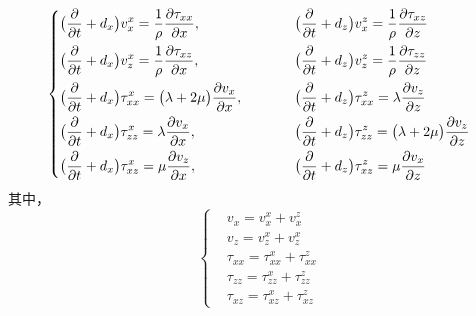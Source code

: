 \documentclass[UTF8]{ctexart}
\begin{document}
\begin{equation}
\left\{ \begin{aligned}
& \big(\frac{\partial}{\partial t}+d_x\big)v_x^x=\frac{1}{\rho}\frac{\partial \tau_{xx}}{\partial x}, & \hspace{10mm} & \big(\frac{\partial}{\partial t}+d_z\big)v_x^z=\frac{1}{\rho}\frac{\partial \tau_{xz}}{\partial z} \\
& \big(\frac{\partial}{\partial t}+d_x\big)v_z^x=\frac{1}{\rho}\frac{\partial \tau_{xz}}{\partial x}, & \hspace{10mm} & \big(\frac{\partial}{\partial t}+d_z\big)v_z^z=\frac{1}{\rho}\frac{\partial \tau_{zz}}{\partial z} \\
& \big(\frac{\partial}{\partial t}+d_x\big)\tau_{xx}^x=\big(\lambda+2\mu\big)\frac{\partial v_x}{\partial x}, & \hspace{10mm} & \big(\frac{\partial}{\partial t}+d_z\big)\tau_{xx}^z=\lambda\frac{\partial v_z}{\partial z} \\
& \big(\frac{\partial}{\partial t}+d_x\big)\tau_{zz}^x=\lambda\frac{\partial v_x}{\partial x}, & \hspace{10mm} & \big(\frac{\partial}{\partial t}+d_z\big)\tau_{zz}^z=\big(\lambda+2\mu\big)\frac{\partial v_z}{\partial z} \\
& \big(\frac{\partial}{\partial t}+d_x\big)\tau_{xz}^x=\mu\frac{\partial v_z}{\partial x}, & \hspace{10mm} & \big(\frac{\partial}{\partial t}+d_z\big)\tau_{xz}^z=\mu\frac{\partial v_x}{\partial z}
\end{aligned} \right.
\end{equation}
其中，
\begin{equation}\label{eq:vt+}
\left\{ \begin{aligned}
& v_x=v_x^x+v_x^z \\
& v_z=v_z^x+v_z^x \\
& \tau_{xx}=\tau_{xx}^x+\tau_{xx}^z \\
& \tau_{zz}=\tau_{zz}^x+\tau_{zz}^z \\
& \tau_{xz}=\tau_{xz}^x+\tau_{xz}^z
\end{aligned} \right.
\end{equation}\par
\end{document}
